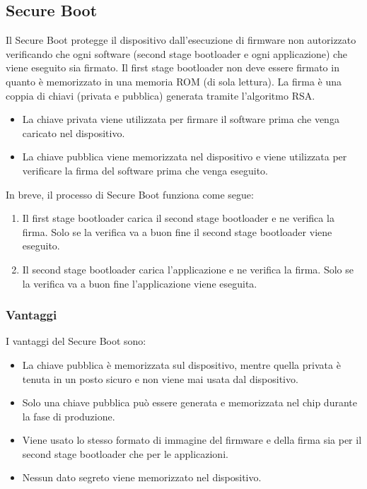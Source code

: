 \documentclass[a4paper]{article}
\begin{document}
\subsection{Secure Boot}
Il Secure Boot protegge il dispositivo dall'esecuzione di firmware non autorizzato
verificando che ogni software (second stage bootloader e ogni applicazione)
che viene eseguito sia firmato. Il first stage bootloader non deve essere firmato
in quanto è memorizzato in una memoria ROM (di sola lettura).
La firma è una coppia di chiavi (privata e pubblica) generata tramite l'algoritmo
RSA.
\begin{itemize}
  \item La chiave privata viene utilizzata per firmare il software prima
    che venga caricato nel dispositivo.
  \item La chiave pubblica viene memorizzata nel dispositivo e viene utilizzata
    per verificare la firma del software prima che venga eseguito.
\end{itemize}

\noindent
In breve, il processo
di Secure Boot funziona come segue:
\begin{enumerate}
  \item Il first stage bootloader carica il second stage bootloader e ne verifica la firma.
    Solo se la verifica va a buon fine il second stage bootloader viene eseguito.
  \item Il second stage bootloader carica l'applicazione e ne verifica la firma.
    Solo se la verifica va a buon fine l'applicazione viene eseguita.
\end{enumerate}

\subsubsection{Vantaggi}
I vantaggi del Secure Boot sono:
\begin{itemize}
  \item La chiave pubblica è memorizzata sul dispositivo, mentre quella privata è 
    tenuta in un posto sicuro e non viene mai usata dal dispositivo.

  \item Solo una chiave pubblica può essere generata e memorizzata nel chip
    durante la fase di produzione.

  \item Viene usato lo stesso formato di immagine del firmware e della firma sia
    per il second stage bootloader che per le applicazioni.

  \item Nessun dato segreto viene memorizzato nel dispositivo.
\end{itemize}
\end{document}
